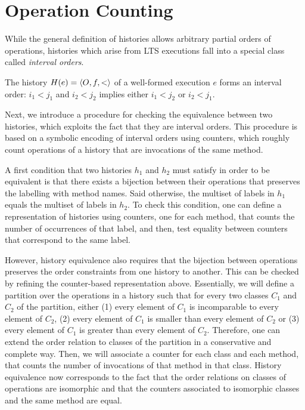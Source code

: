 \section{Operation Counting}

While the general definition of histories allows arbitrary partial orders of
operations, histories which arise from LTS executions fall into a special class
called \emph{interval orders}.

\begin{lemma}

  The history $H(e) = \left\langle {O,f,<} \right\rangle$ of a well-formed execution $e$ forms an
  interval order: $i_1 < j_1$  and $i_2 < j_2$ implies either
  $i_1 < j_2$ or $i_2 < j_1$.

\end{lemma}

Next, we introduce a procedure for checking the equivalence between two histories, which exploits the fact that they are interval orders.
This procedure is based on a symbolic encoding of interval orders using counters, which roughly count operations of a history that are invocations of the same method. 

A first condition that two histories $h_1$ and $h_2$ must satisfy in order to be equivalent is that there exists a bijection between their operations that 
preserves the labelling with method names. Said otherwise, the multiset of labels in $h_1$ equals the multiset of labels in $h_2$.
To check this condition, one can define a representation of histories using counters, one for each method, that counts the number of occurrences of that label, and then, test equality between counters that correspond to the same label.

However, history equivalence also requires that the bijection between operations preserves the order constraints from one history to another. This can be checked by refining the counter-based representation above. Essentially, we will define a partition over the operations in a history such that for every two classes $C_1$ and $C_2$ of the partition, either (1) every element of $C_1$ is incomparable to every element of $C_2$, (2) every element of $C_1$ is smaller than every element of $C_2$ or (3) every element of $C_1$ is greater than every element of $C_2$. Therefore, one can extend the order relation to classes of the partition in a conservative and complete way. Then, we will associate a counter for each class and each method, that counts the number of invocations of that method in that class. History equivalence now corresponds to the fact that the order relations on classes of operations are isomorphic and that the counters associated to isomorphic classes and the same method are equal.

